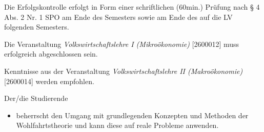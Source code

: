 \begin{course}

\setdoclanguagegerman
{}



\coursehead


\label{cour_7075.dp_997}


\begin{styleenv}
\begin{assessment}
Die Erfolgskontrolle erfolgt in Form einer schriftlichen (60min.) Prüfung nach § 4 Abs. 2 Nr. 1 SPO am Ende des Semesters sowie am Ende des auf die LV folgenden Semesters.


\end{assessment}

\begin{conditions}Die Veranstaltung \emph{Volkswirtschaftslehre I (Mikroökonomie)} [2600012] muss erfolgreich abgeschlossen sein.

\end{conditions}

\begin{recommendations}Kenntnisse aus der Veranstaltung \emph{Volkswirtschaftslehre II (Makroökonomie)} [2600014] werden empfohlen.

\end{recommendations}
\end{styleenv}

\begin{learningoutcomes}
Der/die Studierende

 \begin{itemize}\item beherrscht den Umgang mit grundlegenden Konzepten und Methoden der Wohlfahrtstheorie und kann diese auf reale Probleme anwenden.  \end{itemize}
\end{learningoutcomes}


\end{course}
